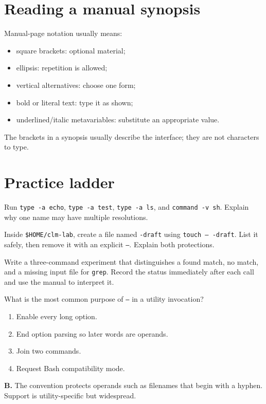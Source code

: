\documentclass[11pt,oneside,openany]{book}
\newcommand{\fourchoices}[4]{%
  \begin{enumerate}[label=\Alph*),leftmargin=2em,itemsep=0.25em]
    \item #1
    \item #2
    \item #3
    \item #4
  \end{enumerate}}
\begin{document}
\section{Reading a manual synopsis}
Manual-page notation usually means:
\begin{itemize}
  \item square brackets: optional material;
  \item ellipsis: repetition is allowed;
  \item vertical alternatives: choose one form;
  \item bold or literal text: type it as shown;
  \item underlined/italic metavariables: substitute an appropriate value.
\end{itemize}
The brackets in a synopsis usually describe the interface; they are not characters to type.

\section{Practice ladder}
\begin{practicebox}[title={Easy -- resolve names}]
Run \texttt{type -a echo}, \texttt{type -a test}, \texttt{type -a ls}, and \texttt{command -v sh}. Explain why one name may have multiple resolutions.
\end{practicebox}
\begin{practicebox}[title={Medium -- test option termination}]
Inside \texttt{\$HOME/clm-lab}, create a file named \texttt{-draft} using \texttt{touch -- -draft}. List it safely, then remove it with an explicit \texttt{--}. Explain both protections.
\end{practicebox}
\begin{practicebox}[title={Hard -- status protocol}]
Write a three-command experiment that distinguishes a found match, no match, and a missing input file for \texttt{grep}. Record the status immediately after each call and use the manual to interpret it.
\end{practicebox}

\begin{questionbox}[title={Medium 2.1 -- Option parsing}]
What is the most common purpose of \texttt{--} in a utility invocation?
\fourchoices{Enable every long option.}{End option parsing so later words are operands.}{Join two commands.}{Request Bash compatibility mode.}
\end{questionbox}
\begin{answerbox}
\textbf{B.} The convention protects operands such as filenames that begin with a hyphen. Support is utility-specific but widespread.
\end{answerbox}
\end{document}
